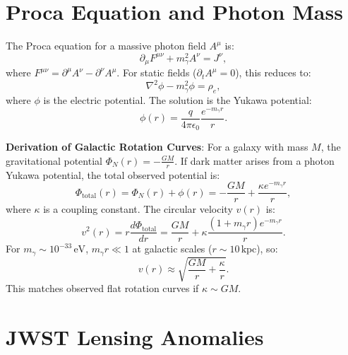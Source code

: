 \documentclass[12pt, a4paper]{article}
\begin{document}
\section{Proca Equation and Photon Mass}  
\label{sec:proca}  

The Proca equation for a massive photon field \( A^\mu \) is:  
\begin{equation}  
\partial_\mu F^{\mu\nu} + m_\gamma^2 A^\nu = J^\nu,  
\label{eq:proca}  
\end{equation}  
where \( F^{\mu\nu} = \partial^\mu A^\nu - \partial^\nu A^\mu \). For static fields (\( \partial_t A^\mu = 0 \)), this reduces to:  
\begin{equation}  
\nabla^2 \phi - m_\gamma^2 \phi = \rho_e,  
\label{eq:yukawa}  
\end{equation}  
where \( \phi \) is the electric potential. The solution is the Yukawa potential:  
\begin{equation}  
\phi(r) = \frac{q}{4\pi \epsilon_0} \frac{e^{-m_\gamma r}}{r}.  
\label{eq:yukawa_sol}  
\end{equation}  

\textbf{Derivation of Galactic Rotation Curves}:  
For a galaxy with mass \( M \), the gravitational potential \( \Phi_N(r) = -\frac{GM}{r} \). If dark matter arises from a photon Yukawa potential, the total observed potential is:  
\begin{equation}  
\Phi_{\text{total}}(r) = \Phi_N(r) + \phi(r) = -\frac{GM}{r} + \frac{\kappa e^{-m_\gamma r}}{r},  
\label{eq:total_potential}  
\end{equation}  
where \( \kappa \) is a coupling constant. The circular velocity \( v(r) \) is:  
\begin{equation}  
v^2(r) = r \frac{d\Phi_{\text{total}}}{dr} = \frac{GM}{r} + \kappa \frac{(1 + m_\gamma r) e^{-m_\gamma r}}{r}.  
\label{eq:velocity}  
\end{equation}  
For \( m_\gamma \sim 10^{-33} \, \text{eV} \), \( m_\gamma r \ll 1 \) at galactic scales (\( r \sim 10 \, \text{kpc} \)), so:  
\begin{equation}  
v(r) \approx \sqrt{\frac{GM}{r} + \frac{\kappa}{r}}.  
\label{eq:velocity_approx}  
\end{equation}  
This matches observed flat rotation curves if \( \kappa \sim GM \).  

\section{JWST Lensing Anomalies}  
\label{sec:lensing}  
\end{document}
